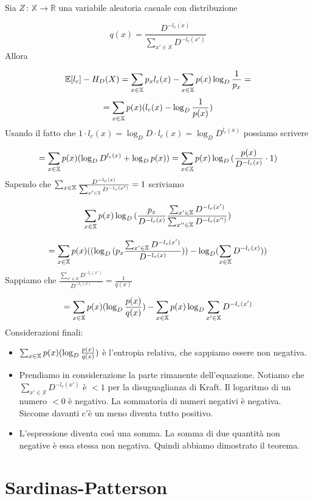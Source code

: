 \documentclass[12pt]{report}
\begin{document}
    \begin{dimo}
        Sia $Z\,:\, \mathbb{X} \rightarrow \mathbb{R}$ una variabile aleatoria casuale con distribuzione

        $$q(x) = \frac{D^{-l_c(x)}}{\sum_{x' \in \mathbb{X} } D^{-l_c(x')}}$$
        Allora

        $$\mathbb{E}[l_c] - H_D(X) = \sum_{x \in \mathbb{X}} p_x l_c(x) - \sum_{x \in \mathbb{X}} p(x) \log_D{\frac{1}{p_x}} =$$
        $$= \sum_{x \in \mathbb{X}} p(x)(l_c(x) - \log_D{\frac{1}{p(x)}})$$
        Usando il fatto che $1 \cdot l_c(x) = \log_D{D} \cdot l_c(x) = \log_D{D^{l_c(x)}}$ possiamo scrivere

        $$= \sum_{x \in \mathbb{X}} p(x) (\log_D{D^{l_c(x)}} + \log_D{p(x)}) = \sum_{x \in \mathbb{X}} p(x) \log_D{(\frac{p(x)}{D^{-l_c(x)}} \cdot 1)}$$
        Sapendo che $\sum_{x \in \mathbb{X}} \frac{D^{-l_c(x)}}{\sum_{x' \in \mathbb{X}} D^{-l_c(x')}} = 1$ scriviamo

        $$\sum_{x \in \mathbb{X}} p(x) \log_D{(\frac{p_x}{D^{-l_c(x)}} \frac{ \sum_{x' \in \mathbb{X}} D^{-l_c(x')}}{\sum_{x'' \in \mathbb{X}} D^{-l_c(x'')}})}$$

        $$=  \sum_{x \in \mathbb{X}} p(x) ( (\log_D{(p_x \frac{\sum_{x' \in \mathbb{X} } D^{-l_c(x')}}{D^{-l_c(x)}})}) - \log_D(\sum_{x \in \mathbb{X}} D^{-l_c(x)}))$$
        Sappiamo che $\frac{\sum_{x' \in \mathbb{X} } D^{-l_c(x')}} {D^{-l_c(x)}}= \frac{1}{q(x)}$

        $$= \sum_{x \in \mathbb{X}} p(x) (\log_D{\frac{p(x)}{q(x)}}) - \sum_{x \in \mathbb{X}} p(x) \log_D{\sum_{x' \in \mathbb{X}} D^{-l_c(x')}}$$
        Considerazioni finali:

        \begin{itemize}
            \item $\sum_{x \in \mathbb{X}} p(x) (\log_D{\frac{p(x)}{q(x)}})$ è l'entropia relativa, che sappiamo essere non negativa.
            \item Prendiamo in considerazione la parte rimanente dell'equazione. Notiamo che $\sum_{x' \in \mathbb{X}} D^{-l_c(x')}$ è $<1$ per la disuguaglianza di Kraft. Il logaritmo di un numero $<0$ è negativo. La sommatoria di numeri negativi è negativa. Siccome davanti c'è un meno diventa tutto positivo.
            \item L'espressione diventa così una somma. La somma di due quantità non negative è essa stessa non negativa. Quindi abbiamo dimostrato il teorema.
        \end{itemize}
    \end{dimo}


    \section{Sardinas-Patterson}
\end{document}
